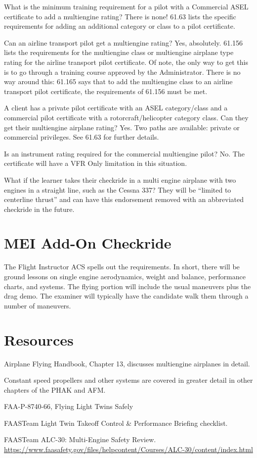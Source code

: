 What is the minimum training requirement for a pilot with a Commercial ASEL certificate
to add a multiengine rating? There is none! 61.63 lists the specific requirements for adding an
additional category or class to a pilot certificate.

Can an airline transport pilot get a multiengine rating? Yes, absolutely. 61.156 lists the requirements
for the multiengine class or multiengine airplane type rating for the airline transport pilot certificate.
Of note, the only way to get this is to go through a training course approved by the Administrator. There is
no way around this: 61.165 says that to add the multiengine class to an airline transport pilot certificate,
the requirements of 61.156 must be met.

A client has a private pilot certificate with an ASEL category/class and a commercial pilot
certificate with a rotorcraft/helicopter category class. Can they get their multiengine airplane
rating? Yes. Two paths are available: private or commercial privileges. See 61.63
for further details.

Is an instrument rating required for the commercial multiengine pilot? No. The certificate will have
a VFR Only limitation in this situation.

What if the learner takes their checkride in a multi engine airplane with two engines in a straight line, such as the Cessna 337?
They will be ``limited to centerline thrust'' and
can have this endorsement removed with an abbreviated checkride in the future.

\section{MEI Add-On Checkride}

The Flight Instructor ACS spells out the requirements. In short, there will be ground lessons on 
single engine aerodynamics, weight and balance, performance charts, and systems. The flying
portion will include the usual maneuvers plus the drag demo. The examiner will typically have the
candidate walk them through a number of maneuvers.

\section{Resources}

Airplane Flying Handbook, Chapter 13, discusses multiengine airplanes in detail.

Constant speed propellers and other systems are covered in greater detail in other chapters of the PHAK and AFM.

FAA-P-8740-66, Flying Light Twins Safely

FAASTeam Light Twin Takeoff Control \& Performance Briefing checklist.

FAASTeam ALC-30: Multi-Engine Safety Review.\\\url{https://www.faasafety.gov/files/helpcontent/Courses/ALC-30/content/index.html}


